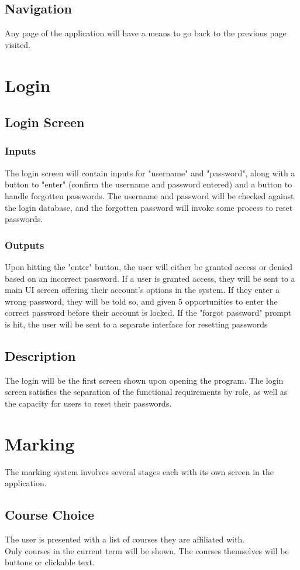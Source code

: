 \documentclass{article}
\begin{document}
\subsection{Navigation}
Any page of the application will have a means to go back to the previous
page visited.

\section{Login}
\subsection{Login Screen}
\subsubsection{Inputs}
The login screen will contain inputs for "username" and "password", along with a
button to "enter" (confirm the username and password entered) and a button to handle
forgotten passwords. The username and password will be checked against the login database,
and the forgotten password will invoke some process to reset passwords.
\subsubsection{Outputs}
Upon hitting the "enter" button, the user will either be granted access or denied based
on an incorrect password. If a user is granted access, they will be sent
to a main UI screen offering their account's options in the system. If they enter a wrong
password, they will be told so, and given 5 opportunities to enter the correct password
before their account is locked. If the "forgot password" prompt is hit, the user will be sent
to a separate interface for resetting passwords
\subsection{Description}
The login will be the first screen shown upon opening the program. The login screen 
satisfies the separation of the functional requirements by role, as well as the capacity for users
to reset their passwords.

\section{Marking}
The marking system involves several stages each with its own screen in
the application.
\subsection{Course Choice}
The user is presented with a list of courses they are affiliated with. \\
Only courses in the current term will be shown. The courses themselves
will be buttons or clickable text.
\end{document}
